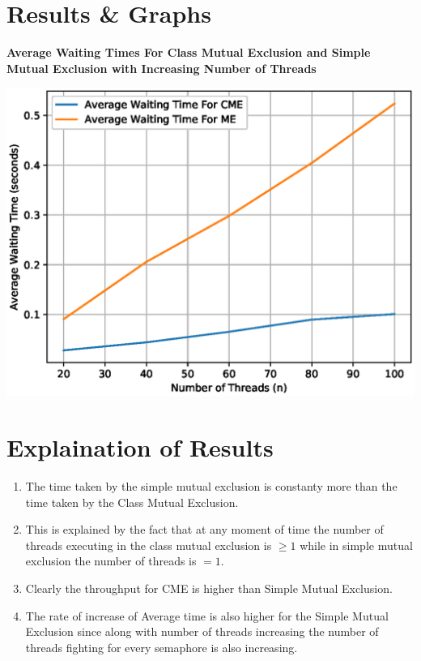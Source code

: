 \documentclass[a4paper,12pt]{report}
\begin{document}
\section{Results \& Graphs}
\begin{center}
\begin{large}
\textbf{Average Waiting Times For Class Mutual Exclusion and Simple Mutual Exclusion with Increasing Number of Threads}\\
\end{large}
\includegraphics[scale=1]{./graphClass.eps}
\end{center}
\newpage
\section{Explaination of Results}
\begin{enumerate}
\item The time taken by the simple mutual exclusion is constanty more than the time taken by the Class Mutual Exclusion.
\item This is explained by the fact that at any moment of time the number of threads executing in the class mutual exclusion is $\geq1$ while in simple mutual exclusion the number of threads is $=1$.
\item Clearly the throughput for CME is higher than Simple Mutual Exclusion.
\item The rate of increase of Average time is also higher for the Simple Mutual Exclusion since along with number of threads increasing the number of threads fighting for every semaphore is also increasing.
\end{enumerate}
\end{document}
